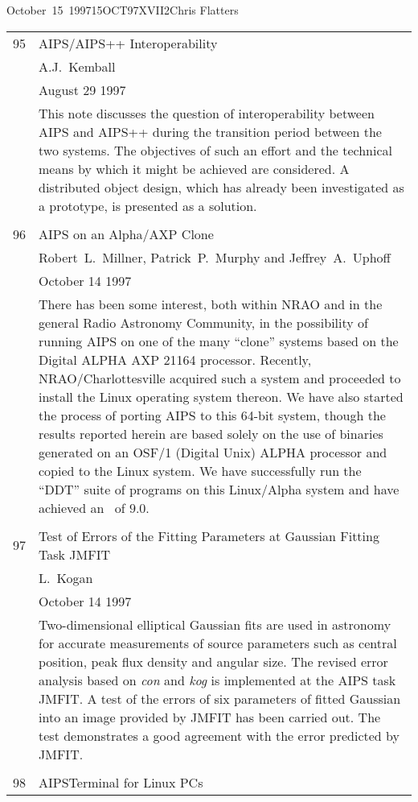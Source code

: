 \documentclass[twoside]{article}
\begin{document}
\begin{aipsletter}{October~15~1997}{15OCT97}{XVII}{2}{Chris Flatters}
\begin{tabular}{lp{6in}}
95 &	AIPS/AIPS++ Interoperability \\
   &	A.J.~Kemball \\
   &    August 29 1997 \\
   &    This note discusses the question of interoperability between
	AIPS and AIPS++ during the transition period between the two
        systems. The objectives of such an effort and the technical
        means by which it might be achieved are considered.  A
        distributed object design, which has already been investigated
        as a prototype, is presented as a solution. \\
   &    \\
96 &    AIPS on an Alpha/AXP Clone \\
   &    Robert~L.~Millner, Patrick~P.~Murphy and Jeffrey~A.~Uphoff \\
   &	October 14 1997 \\
   &	There has been some interest, both within NRAO and in the
	general Radio Astronomy Community, in the possibility of
	running AIPS on one of the many ``clone'' systems based on the
	Digital ALPHA AXP 21164 processor. Recently,
	NRAO/Charlottesville acquired such a system and proceeded to
	install the Linux operating system thereon.  We have also started the
	process of porting AIPS to this 64-bit system, though the
	results reported herein are based solely on the use of binaries
	generated on an OSF/1 (Digital Unix) ALPHA processor and
	copied to the Linux system.  We have successfully run the
	``DDT'' suite of programs on this Linux/Alpha system
	and have achieved an \AIPSmark\ of $9.0$. \\
    &	\\
97 &	Test of Errors of the Fitting Parameters at Gaussian Fitting
	Task JMFIT \\
   &	L.~Kogan \\
   &	October 14 1997 \\
   &	Two-dimensional elliptical Gaussian fits are used in astronomy
	for accurate measurements of source parameters such as central
	position, peak flux density and angular size. The revised
	error analysis based on \emph{con} and \emph{kog} is
	implemented at the AIPS task JMFIT. A test of the errors of
	six parameters of fitted Gaussian into an image provided by
	JMFIT has been carried out. The test demonstrates a good
	agreement with the error predicted by JMFIT. \\
   &	\\
98 &	AIPSTerminal for Linux PCs \\

\end{tabular}
\end{aipsletter}
\end{document}
